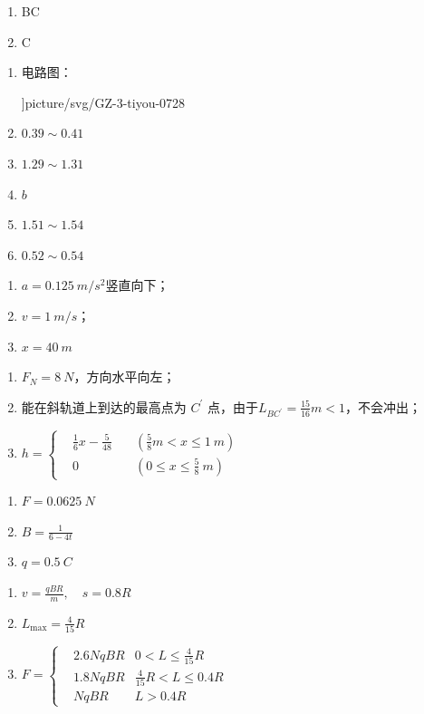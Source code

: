 \item \begin {enumerate} \item BC \item C \end {enumerate}
\item \begin {enumerate} \item 电路图： \begin {center} \linewidth ]{picture/svg/GZ-3-tiyou-0728} \end {center} \item $0.39 \sim 0.41$ \item $1.29 \sim 1.31$ \item $ b $ \item $1.51 \sim 1.54$ \item $0.52 \sim 0.54$ \end {enumerate}
\item \begin {enumerate} \item $ a=0.125\ m/s^{2} $竖直向下； \item $ v=1 \ m/s $； \item $ x=40 \ m $ \end {enumerate}
\item \begin {enumerate} \item $ F_{N}=8 \ N $，方向水平向左； \item 能在斜轨道上到达的最高点为 $C^{\prime }$ 点，由于$L_{BC^{\prime }}=\frac {15}{16} m<1$，不会冲出； \item $ h= \left \{ \begin {aligned} &\frac {1}{6} x-\frac {5}{48} \quad &\left (\frac {5}{8} m<x \leq 1 \ m\right )\\ &0 \quad &\left (0 \leq x \leq \frac {5}{8} \ m\right ) \end {aligned} \right . $ \end {enumerate}
\item \begin {enumerate} \item $ F=0.0625 \ N $ \item $B=\frac {1}{6-4 t}$ \item $ q=0.5 \ C $ \end {enumerate}
\item \begin {enumerate} \item $v=\frac {q B R}{m}, \quad s=0.8 R$ \item $L_{\max }=\frac {4}{15} R$ \item $ F= \left \{ \begin {aligned} &2.6 NqBR &0<L \leq \frac {4}{15} R\\ &1.8 NqBR &\frac {4}{15} R<L \leq 0.4 R\\ &N q B R &L>0.4 R \end {aligned} \right . $ \end {enumerate}
